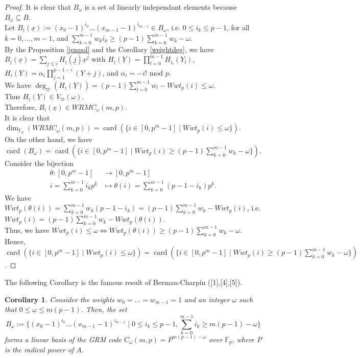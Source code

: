 \documentclass{article}
\theoremstyle{plain}
\newtheorem{cor}[thm]{Corollary}
\theoremstyle{definition}
\DeclareMathOperator{\card}{card}
\begin{document}
\begin{proof}
It is clear that $B_{\omega}$ is a set of linearly independant elements because $B_{\omega}\subseteq B$.\\
Let $B_{\underline{i}}(\underline{x}):=(x_{0}-1)^{i_0}\ldots (x_{m-1}-1)^{i_{m-1}} \in B_{\omega}$, i.e. $0\leq i_{k}\leq p-1$, for all $k=0,\ldots ,m-1$, and $\sum_{k=0}^{m-1}w_{k}i_{k}\geq (p-1)\sum_{k=0}^{m-1}w_{k}-\omega$.\\
By the Proposition \ref{jenpol} and the Corollary \ref{weightdeg}, we have $B_{\underline{i}}(\underline{x})=\sum_{\underline{j}\leq \underline{i}}H_{\underline{i}}(\underline{j})\underline{x}^{\underline{j}}$ with $H_{\underline{i}}(\underline{Y})=\prod_{l=0}^{m-1}H_{i_l}(Y_l)$, $H_i(Y) = \alpha_i \prod_{j=1}^{p-1-i} (Y+j)$, and $\alpha_i = - i! \mbox{ mod } p$.\\
We have $\deg_{\varpi}(H_{\underline{i}}(\underline{Y}))=(p-1)\sum_{l=0}^{m-1}w_{l}-Wwt_{p}(i)\leq \omega$.\\
Thus $H_{\underline{i}}(\underline{Y})\in V_{\varpi}(\omega)$.\\
Therefore, $B_{\underline{i}}(\underline{x})\in WRMC_{\omega}(m,p)$.\\
It is clear that $\dim_{\mathbb{F}_{p}}(WRMC_{\omega}(m,p))=\card(\{i\in [0,p^m-1]\mid Wwt_{p}(i)\leq \omega\})$.\\
On the other hand, we have $\card(B_{\omega})=\card(\{i\in[0,p^m-1]\mid Wwt_{p}(i)\geq (p-1)\sum_{k=0}^{m-1}w_{k}-\omega\})$.\\
Consider the bijection
\begin{equation*}
\begin{aligned}
\theta : [0,p^m-1] &\longrightarrow [0,p^m-1]\\
         i=\sum_{k=0}^{m-1}i_{k}p^{k}&\longmapsto \theta(i)=\sum_{k=0}^{m-1}(p-1-i_{k})p^{k}.
\end{aligned}
\end{equation*}
We have $Wwt_{p}(\theta(i))=\sum_{k=0}^{m-1}w_{k}(p-1-i_{k})=(p-1)\sum_{k=0}^{m-1}w_{k}-Wwt_{p}(i)$, i.e. $Wwt_{p}(i)=(p-1)\sum_{k=0}^{m-1}w_{k}-Wwt_{p}(\theta(i))$.\\
Thus, we have $Wwt_{p}(i)\leq \omega \Longleftrightarrow Wwt_{p}(\theta(i))\geq (p-1)\sum_{k=0}^{m-1}w_{k}-\omega$.\\
Hence, $\card(\{i\in[0,p^m-1]\mid Wwt_{p}(i)\leq \omega\})=\card(\{i\in[0,p^m-1]\mid Wwt_{p}(i)\geq (p-1)\sum_{k=0}^{m-1}w_{k}-\omega\})$.
\end{proof}
The following Corollary is the famous result of Berman-Charpin ([1],[4],[5]).
\begin{cor}
Consider the weights $w_{0}=\ldots =w_{m-1}=1$ and an integer $\omega$ such that $0\leq \omega\leq m(p-1)$. Then, the set
\begin{equation*}
B_{\omega}:=\{(x_{0}-1)^{i_{0}}\ldots (x_{m-1}-1)^{i_{m-1}}\mid 0\leq i_{k}\leq p-1, \sum_{k=0}^{m-1}i_{k}\geq m(p-1)-\omega\}
\end{equation*}
forms a linear basis of the GRM code $C_{\omega}(m,p)=P^{m(p-1)-\omega}$ over $\mathbb{F}_{p}$, where $P$ is the radical power of $A$.
\end{cor}
\end{document}
